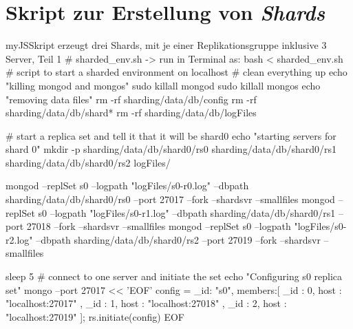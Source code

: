 \section{Skript zur Erstellung von \textit{Shards}}\label{shardSys}

\begin{listingsboxJavaScript}[label={lst:createShards}]{myJS}{Skript erzeugt drei Shards, mit je einer Replikationsgruppe inklusive 3 Server, Teil 1}
# sharded_env.sh -> run in Terminal as: bash < sharded_env.sh
# script to start a sharded environment on localhost
# clean everything up
echo "killing mongod and mongos"
sudo killall mongod
sudo killall mongos
echo "removing data files"
rm -rf sharding/data/db/config
rm -rf sharding/data/db/shard*
rm -rf sharding/data/db/logFiles

# start a replica set and tell it that it will be shard0
echo "starting servers for shard 0"
mkdir -p sharding/data/db/shard0/rs0 sharding/data/db/shard0/rs1 
sharding/data/db/shard0/rs2 logFiles/

mongod --replSet s0 --logpath "logFiles/s0-r0.log" 
--dbpath sharding/data/db/shard0/rs0 --port 27017 --fork --shardsvr --smallfiles
mongod --replSet s0 --logpath "logFiles/s0-r1.log" 
--dbpath sharding/data/db/shard0/rs1 --port 27018 --fork --shardsvr --smallfiles
mongod --replSet s0 --logpath "logFiles/s0-r2.log" 
--dbpath sharding/data/db/shard0/rs2 --port 27019 --fork --shardsvr --smallfiles

sleep 5
# connect to one server and initiate the set
echo "Configuring s0 replica set"
mongo --port 27017 << 'EOF'
config = { _id: "s0", members:[
          { _id : 0, host : "localhost:27017" },
          { _id : 1, host : "localhost:27018" },
          { _id : 2, host : "localhost:27019" }]};
rs.initiate(config)
EOF
\end{listingsboxJavaScript}

